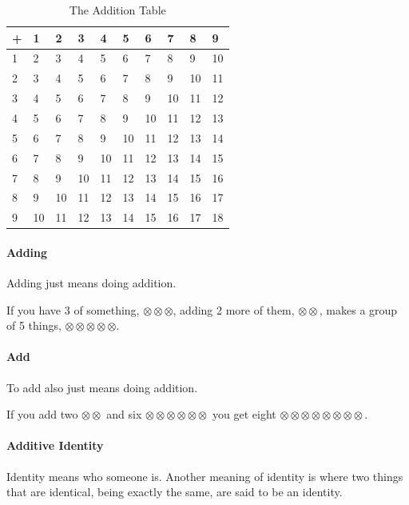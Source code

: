 \documentclass[12pt]{article}
\begin{document}
\begin{table}[h]
\centering
\begin{tabular}{|l|l|l|l|l|l|l|l|l|l|}
\hline
+ & 1  & 2  & 3  & 4  & 5  & 6  & 7  & 8  & 9                       \\ \hline
1 & 2  & 3  & 4  & 5  & 6  & 7  & 8  & 9  & 10                      \\ \hline
2 & 3  & 4  & 5  & 6  & 7  & 8  & 9  & 10 & 11                      \\ \hline
3 & 4  & 5  & 6  & 7  & 8  & 9  & 10 & 11 & 12                      \\ \hline
4 & 5  & 6  & 7  & 8  & 9  & 10 & 11 & 12 & 13                      \\ \hline
5 & 6  & 7  & 8  & 9  & 10 & 11 & 12 & 13 & 14                      \\ \hline
6 & 7  & 8  & 9  & 10 & 11 & 12 & 13 & 14 & 15                      \\ \hline
7 & 8  & 9  & 10 & 11 & 12 & 13 & 14 & 15 & 16                      \\ \hline
8 & 9  & 10 & 11 & 12 & 13 & 14 & 15 & 16 & 17                      \\ \hline
9 & 10 & 11 & 12 & 13 & 14 & 15 & 16 & 17 & \multicolumn{1}{c|}{18} \\ \hline
\end{tabular}
\caption*{The Addition Table}
\end{table}

\paragraph{Adding}
Adding just means doing addition.

If you have 3 of something, $\otimes\otimes\otimes$, adding 2 more of them, $\otimes\otimes$, makes a group of 5 things, $\otimes\otimes\otimes\otimes\otimes$.

\paragraph{Add}
To add also just means doing addition.

If you add two $\otimes\otimes$ and six $\otimes\otimes\otimes\otimes\otimes\otimes$ you get eight $\otimes\otimes\otimes\otimes\otimes\otimes\otimes\otimes$.

\paragraph{Additive Identity}
Identity means who someone is. Another meaning of identity is where two things that are identical, being exactly the same, are said to be an identity.
\end{document}
